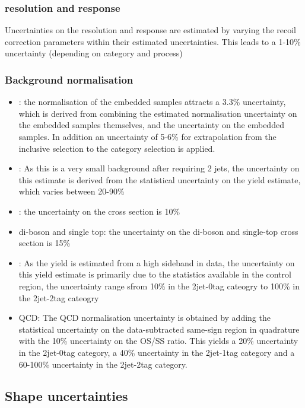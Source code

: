 \subsubsection*{\MET resolution and response}
Uncertainties on the \MET resolution and response are estimated by varying
the recoil correction parameters within their estimated uncertainties. This 
leads to a 1-10\% uncertainty (depending on category and process)

\subsubsection*{Background normalisation}
\begin{itemize}
\item \Ztautau : the normalisation of the embedded samples attracts a 3.3\% uncertainty, which is derived
from combining the estimated normalisation uncertainty on the embedded samples themselves, and the uncertainty on the \ttbar embedded samples. In addition an uncertainty of 5-6\% for extrapolation from the inclusive selection to the category selection is applied.
\item \Zellell: As this is a very small background after requiring 2 jets, the uncertainty on this estimate is derived from the statistical uncertainty on the yield estimate, which varies between 20-90\%
\item \ttbar: the uncertainty on the \ttbar cross section is 10\%
\item di-boson and single top: the uncertainty on the di-boson and single-top cross section is 15\%
\item \Wjets: As the \Wjets yield is estimated from a high \mT sideband in data, the uncertainty on this yield estimate is primarily due to the statistics available in the control region, the uncertainty range sfrom 10\% in the 2jet-0tag cateogry to 100\% in the 2jet-2tag cateogry
\item QCD: The QCD normalisation uncertainty is obtained by adding the statistical uncertainty on the data-subtracted same-sign region in quadrature with the 10\% uncertainty on the OS/SS ratio. This yields a 20\% uncertainty in the 2jet-0tag category, a 40\% uncertainty in the 2jet-1tag category and a 60-100\% uncertainty in the 2jet-2tag category.
\end{itemize}

\subsection{Shape uncertainties}
\label{sec:hhh_uncerts_shape}

